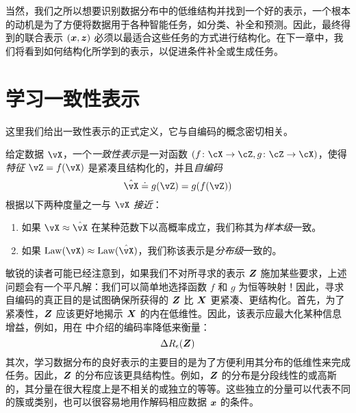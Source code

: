 \documentclass[../../book-main_zh.tex]{subfiles}
\begin{document}
当然，我们之所以想要识别数据分布中的低维结构并找到一个好的表示，一个根本的动机是为了方便将数据用于各种智能任务，如分类、补全和预测。因此，最终得到的联合表示 $(\bm{x}, \bm{z})$ 必须以最适合这些任务的方式进行结构化。在下一章中，我们将看到如何结构化所学到的表示，以促进条件补全或生成任务。

\section{学习一致性表示}\label{sec:consistent-representation}

这里我们给出一致性表示的正式定义，它与自编码的概念密切相关。%
\begin{definition}[一致性表示]\label{def:bidirectional_rep}
  给定数据 \(\vX\)，一个\textit{一致性表示}是一对函数 \((f \colon \cX \to \cZ, g \colon \cZ \to \cX)\)，使得\textit{特征} \(\vZ = f(\vX)\) 是紧凑且结构化的，并且\textit{自编码} \[\hat{\vX} \doteq g(\vZ)
  = g(f(\vZ))\] 根据以下两种度量之一与 \(\vX\) \textit{接近}：
  \begin{enumerate}
    \item 如果 \(\vX \approx \hat{\vX}\) 在某种范数下以高概率成立，我们称其为\textit{样本级}一致。
    \item 如果 \(\Law(\vX) \approx \Law(\hat{\vX})\)，我们称该表示是\textit{分布级}一致的。
  \end{enumerate}
\end{definition}

敏锐的读者可能已经注意到，如果我们不对所寻求的表示 $\bm{Z}$ 施加某些要求，上述问题会有一个平凡解：我们可以简单地选择函数 $f$ 和 $g$ 为恒等映射！因此，寻求自编码的真正目的是试图确保所获得的 $\bm{Z}$ 比 $\bm{X}$ 更紧凑、更结构化。首先，为了紧凑性，$\bm{Z}$ 应该更好地揭示 $\bm{X}$ 的内在低维性。因此，该表示应最大化某种信息增益，例如，用在  中介绍的编码率降低来衡量：
\begin{equation}
  \Delta R_{\epsilon}(\bm{Z})
\end{equation}
其次，学习数据分布的良好表示的主要目的是为了方便利用其分布的低维性来完成任务。因此，$\bm{Z}$ 的分布应该更具结构性。例如，$\bm{Z}$ 的分布是分段线性的或高斯的，其分量在很大程度上是不相关的或独立的等等。这些独立的分量可以代表不同的簇或类别，也可以很容易地用作解码相应数据 $\bm{x}$ 的条件。
\end{document}
